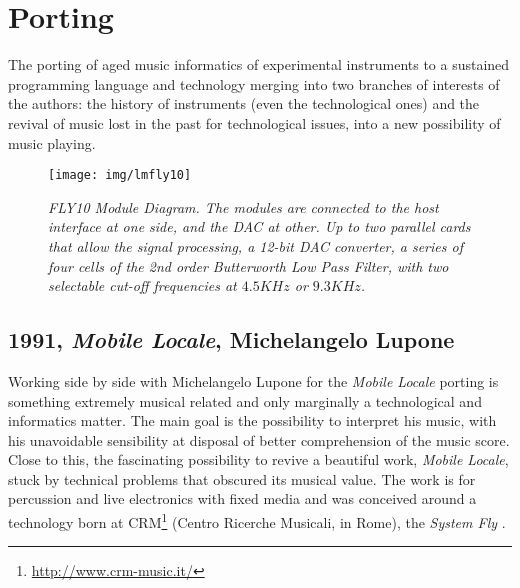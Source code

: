 \documentclass[twoside,a4paper]{article}
\begin{document}


\section{Porting}
\label{sec:porting}

The porting of aged music informatics of experimental instruments to a sustained
programming language and technology merging into two branches of interests of the
authors: the history of instruments (even the technological ones) and the revival
of music lost in the past for technological issues, into a new possibility of
music playing.

\begin{figure}[ht]
\centerline{\texttt{[image: img/lmfly10]}}
\caption{\label{ml-fly10}{\it \emph{FLY10} Module Diagram. The modules are
connected to the host interface at one side, and the DAC at other. Up to two
parallel cards that allow the signal processing, a 12-bit DAC converter, a series
of four cells of the 2nd order Butterworth Low Pass Filter, with two selectable
cut-off frequencies at $4.5KHz$ or $9.3KHz$.
}}
\end{figure}

\subsection{1991, \emph{Mobile Locale}, Michelangelo Lupone}

Working side by side with Michelangelo Lupone for the \emph{Mobile Locale}
\cite{lmml91} porting is something extremely musical related and only marginally
a technological and informatics matter. The main goal is the possibility to
interpret his music, with his unavoidable sensibility at disposal of better
comprehension of the music score. Close to this, the fascinating possibility to
revive a beautiful work, \emph{Mobile Locale}, stuck by technical problems that
obscured its musical value. The work is for percussion and live electronics with
fixed media and was conceived around a technology born at CRM\footnote{\url{http://www.crm-music.it/}}
(Centro Ricerche Musicali, in Rome), the \emph{System Fly} \cite{ml85}.
\end{document}
